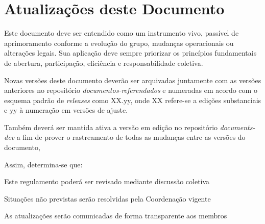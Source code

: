 \documentclass[
  12pt,          %
  a4paper,       %
  oneside,       %
  brazil         %
]{article}
\begin{document}
\section{Atualizações deste Documento}

Este documento deve ser entendido como um instrumento vivo, passível de aprimoramento conforme a evolução do grupo, mudanças operacionais ou alterações legais. 
Sua aplicação deve sempre priorizar os princípios fundamentais de abertura, participação, eficiência e responsabilidade coletiva.

Novas versões deste documento deverão ser arquivadas juntamente com as versões anteriores no repositório \textit{documentos-referendados} e numeradas em acordo
 com o esquema padrão de \textit{releases} como XX.yy, onde XX refere-se a edições substanciais e yy à numeração em versões de ajuste. 
 
Também deverá ser mantida ativa a versão em edição no repositório \textit{documents-dev} a fim de prover o rastreamento de todas as mudanças entre as versões do documento,

Assim, determina-se que:
\begin{conduta}
	\item Este regulamento poderá ser revisado mediante discussão coletiva
	\item Situações não previstas serão resolvidas pela Coordenação vigente
	\item As atualizações serão comunicadas de forma transparente aos membros
\end{conduta}

\vspace{2cm}

\end{document}
